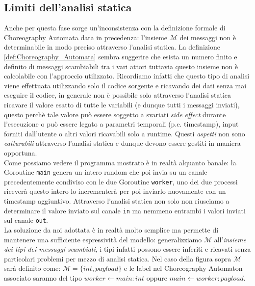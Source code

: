 \subsection{Limiti dell'analisi statica} \label{subsec:Static_Analysis_Limits}
Anche per questa fase sorge un'inconsistenza con la definizione formale di Choreography Automata data in precedenza: l'insieme $\mathcal{M}$ dei messaggi non è determinabile in modo preciso attraverso l'analisi statica. La definizione \ref{def:Choreography_Automata} sembra suggerire che esista un numero finito e definito di messaggi scambiabili tra i vari attori tuttavia questo insieme non è calcolabile con l'approccio utilizzato.
Ricordiamo infatti che questo tipo di analisi viene effettuata utilizzando solo il codice sorgente e ricavando dei dati senza mai eseguire il codice, in generale non è possibile solo attraverso l'analisi statica ricavare il valore esatto di tutte le variabili (e dunque tutti i messaggi inviati), questo perchè tale valore può essere soggetto a svariati \emph{side effect} durante l'esecuzione o può essere legato a parametri temporali (p.e. timestamp), input forniti dall'utente o altri valori ricavabili solo a runtime. Questi \emph{aspetti} non sono \emph{catturabili} attraverso l'analisi statica e dunque devono essere  gestiti in maniera opportuna. \bigskip \\
Come possiamo vedere il programma mostrato è in realtà alquanto banale: la Goroutine \texttt{main} genera un intero random che poi invia su un canale precedentemente condiviso con le due Goroutine \texttt{worker}, uno dei due processi riceverà questo intero lo incrementerà per poi inviarlo nuovamente con un timestamp aggiuntivo. Attraverso l'analisi statica non solo non riusciamo a determinare il valore inviato sul canale \texttt{in} ma nemmeno entrambi i valori inviati sul canale \texttt{out}. \bigskip \\

\bigskip
La soluzione da noi adottata è in realtà molto semplice ma permette di mantenere una sufficiente espressività del modello: generalizziamo $\mathcal{M}$ all'\emph{insieme dei tipi dei messaggi scambiati}, i tipi infatti possono essere inferiti e ricavati senza particolari problemi per mezzo di analisi statica. Nel caso della figura sopra $\mathcal{M}$ sarà definito come: $\mathcal{M} = \{ int, payload \}$ e le label nel Choreography Automaton associato saranno del tipo $worker \leftarrow main : int$ oppure $main \leftarrow worker : payload$.

